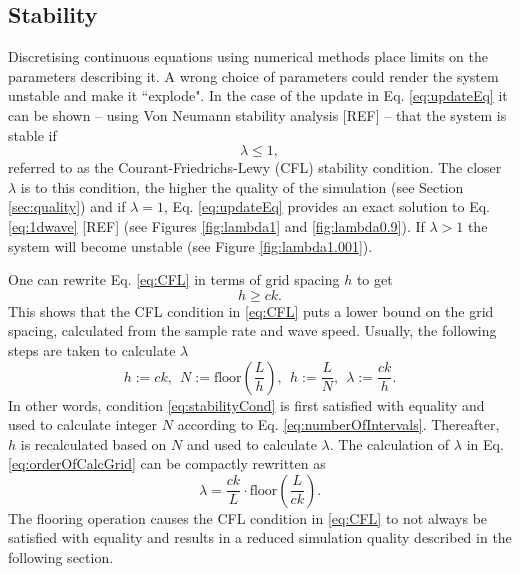 \documentclass[dvipsnames, reprint]{JASA}
\begin{document}
\subsection{Stability}\label{sec:stability}
Discretising continuous equations using numerical methods place limits on the parameters describing it. A wrong choice of parameters could render the system unstable and make it ``explode". In the case of the update in Eq. \eqref{eq:updateEq} it can be shown -- using Von Neumann stability analysis [REF] -- that the system is stable if
\begin{equation}\label{eq:CFL}
    \lambda \leq 1,
\end{equation}
referred to as the Courant-Friedrichs-Lewy (CFL) stability condition. The closer $\lambda$ is to this condition, the higher the quality of the simulation (see Section \ref{sec:quality}) and if $\lambda = 1$, Eq. \eqref{eq:updateEq} provides an exact solution to Eq. \eqref{eq:1dwave} %
[REF] (see Figures \ref{fig:lambda1} and \ref{fig:lambda0.9}). If $\lambda > 1$ the system will become unstable (see Figure \ref{fig:lambda1.001}).
\begin{figure}
\end{figure}
One can rewrite Eq. \eqref{eq:CFL} in terms of grid spacing $h$ to get
\begin{equation}\label{eq:stabilityCond}
    h \geq ck.
\end{equation}
This shows that the CFL condition in \eqref{eq:CFL} puts a lower bound on the grid spacing, calculated from the sample rate and wave speed. Usually, the following steps are taken to calculate $\lambda$
\begin{equation}\label{eq:orderOfCalcGrid}
    h := ck,\ \ N := \text{floor}\left(\frac{L}{h}\right), \ \ h := \frac{L}{N}, \ \ \lambda := \frac{ck}{h}.
\end{equation}
In other words, condition \eqref{eq:stabilityCond} is first satisfied with equality and used to calculate integer $N$ according to Eq. \eqref{eq:numberOfIntervals}. Thereafter, $h$ is recalculated based on $N$ and used to calculate $\lambda$. The calculation of $\lambda$ in Eq. \eqref{eq:orderOfCalcGrid} can be compactly rewritten as
\begin{equation}\label{eq:compactLambda}
    \lambda = \frac{ck}{L}\cdot\text{floor}\left(\frac{L}{ck}\right).
\end{equation}
The flooring operation causes the CFL condition in \eqref{eq:CFL} to not always be satisfied with equality and results in a reduced simulation quality described in the following section.
\end{document}
